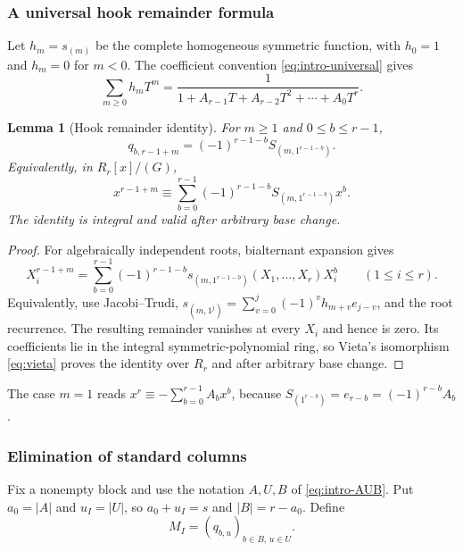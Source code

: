 \documentclass[10pt,fleqn]{article}
\numberwithin{equation}{section}
\newtheorem{lemma}[theorem]{Lemma}
\begin{document}
\subsubsection{A universal hook remainder formula}

Let $h_m=s_{(m)}$ be the complete homogeneous symmetric function, with $h_0=1$ and
$h_m=0$ for $m<0$.  The coefficient convention \eqref{eq:intro-universal} gives
\begin{equation}\label{eq:h-generating}
 \sum_{m\ge0}h_mT^m=
 \frac{1}{1+A_{r-1}T+A_{r-2}T^2+\cdots+A_0T^r}.
\end{equation}

\begin{lemma}[Hook remainder identity]\label{lem:hook-remainder}
For $m\ge1$ and $0\le b\le r-1$,
\begin{equation}\label{eq:hook-remainder}
 q_{b,r-1+m}=(-1)^{r-1-b}S_{(m,1^{r-1-b})}.
\end{equation}
Equivalently, in $R_r[x]/(G)$,
\begin{equation}\label{eq:hook-polynomial-remainder}
 x^{r-1+m}\equiv
 \sum_{b=0}^{r-1}(-1)^{r-1-b}S_{(m,1^{r-1-b})}x^b.
\end{equation}
The identity is integral and valid after arbitrary base change.
\end{lemma}

\begin{proof}
For algebraically independent roots, bialternant expansion gives
\begin{equation}\label{eq:hook-evaluation-identity}
 X_i^{r-1+m}=
 \sum_{b=0}^{r-1}(-1)^{r-1-b}
 s_{(m,1^{r-1-b})}(X_1,\ldots,X_r)X_i^b
 \qquad(1\le i\le r).
\end{equation}
Equivalently, use Jacobi--Trudi,
$s_{(m,1^j)}=\sum_{v=0}^j(-1)^vh_{m+v}e_{j-v}$, and the root recurrence.
The resulting remainder vanishes at every $X_i$ and hence is zero.
Its coefficients lie in the integral symmetric-polynomial ring, so
Vieta's isomorphism \eqref{eq:vieta} proves the identity over $R_r$
and after arbitrary base change.
\end{proof}

The case $m=1$ reads $x^r\equiv-\sum_{b=0}^{r-1}A_bx^b$, because
$S_{(1^{r-b})}=e_{r-b}=(-1)^{r-b}A_b$.

\subsubsection{Elimination of standard columns}

Fix a nonempty block and use the notation $A,U,B$ of \eqref{eq:intro-AUB}.  Put
$a_0=|A|$ and $u_I=|U|$, so $a_0+u_I=s$ and $|B|=r-a_0$.  Define
\begin{equation}\label{eq:MI-definition}
 M_I=(q_{b,u})_{b\in B,\,u\in U}.
\end{equation}
\end{document}
